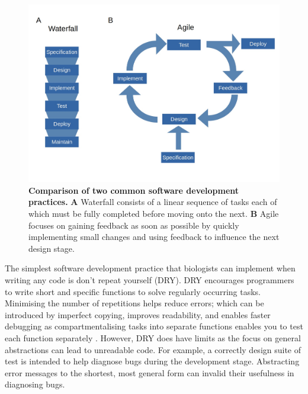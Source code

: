 \documentclass[../main.tex]{subfiles}
\begin{document}
\begin{figure}[h]

{\centering \includegraphics[width=\linewidth]{figures/agileVsWaterfall} 

}

\caption[Summary of Agile and Waterfall software development practices.]{\textbf{Comparison of two common software development practices.} \textbf{A} Waterfall consists of a linear sequence of tasks each of which must be fully completed before moving onto the next. \textbf{B} Agile focuses on gaining feedback as soon as possible by quickly implementing small changes and using feedback to influence the next design stage. }\label{fig:development-practices}
\end{figure}

The simplest software development practice that biologists can implement when writing any code is don't repeat yourself (DRY).
DRY encourages programmers to write short and specific functions to solve regularly occurring tasks. 
Minimising the number of repetitions helps reduce errors; which can be introduced by imperfect copying, improves readability, and enables faster debugging as compartmentalising tasks into separate functions enables you to test each function separately \parencite{Thomas1999}.
However, DRY does have limits as the focus on general abstractions can lead to unreadable code.
For example, a correctly design suite of test is intended to help diagnose bugs during the development stage.
Abstracting error messages to the shortest, most general form can invalid their usefulness in diagnosing bugs.
\end{document}

